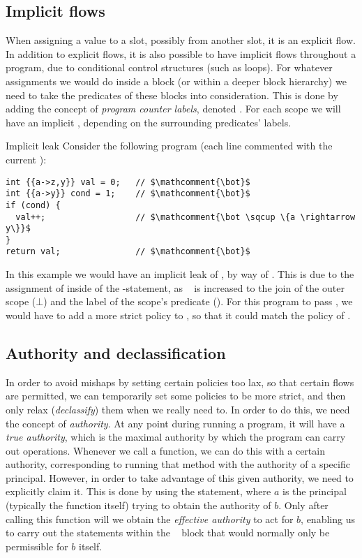 \subsection{Implicit flows}\label{dlm:implicit_flows}
When assigning a value to a slot, possibly from another slot, it is an explicit flow.
In addition to explicit flows, it is also possible to have implicit flows throughout a program, due to conditional control structures (such as loops).
For whatever assignments we would do inside a block (or within a deeper block hierarchy) we need to take the predicates of these blocks into consideration.
This is done by adding the concept of \emph{program counter labels}, denoted \dlmpc.
For each scope we will have an implicit \dlmpc, depending on the surrounding predicates' labels.

\begin{example}{Implicit leak}\label{dlm:ex:implicit_leak}
  Consider the following program (each line commented with the current \dlmpc):
  \begin{lstlisting}[style=dlmc]
int {{a->z,y}} val = 0;   // $\mathcomment{\bot}$
int {{a->y}} cond = 1;    // $\mathcomment{\bot}$
if (cond) {
  val++;                  // $\mathcomment{\bot \sqcup \{a \rightarrow y\}}$
}
return val;               // $\mathcomment{\bot}$
  \end{lstlisting}
  In this example we would have an implicit leak of , by way of .
  This is due to the assignment of  inside of the -statement, as \dlmpc~ is increased to the join of the outer scope ($\bot$) and the label of the scope's predicate ().
  For this program to pass \thetool, we would have to add a more strict policy to , so that it could match the policy of .
\end{example}

\subsection{Authority and declassification}\label{dlm:auth_and_declass}
In order to avoid mishaps by setting certain policies too lax, so that certain flows are permitted, we can temporarily set some policies to be more strict, and then only relax (\emph{declassify}) them when we really need to.
In order to do this, we need the concept of \emph{authority}.
At any point during running a program, it will have a \emph{true authority}, which is the maximal authority by which the program can carry out operations.
Whenever we call a function, we can do this with a certain authority, corresponding to running that method with the authority of a specific principal.
However, in order to take advantage of this given authority, we need to explicitly claim it.
This is done by using the \dlmactsfor{} statement, where $a$ is the principal (typically the function itself) trying to obtain the authority of $b$.
Only after calling this function will we obtain the \emph{effective authority} to act for $b$, enabling us to carry out the statements within the \dlmactsfor~ block that would normally only be permissible for $b$ itself.

